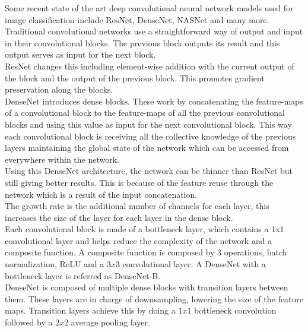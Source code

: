 \documentclass[runningheads,a4paper]{llncs}
\begin{document}
Some recent state of the art deep convolutional neural network models used for image classification include ResNet, DenseNet, NASNet and many more. \\

Traditional convolutional networks use a straightforward way of output and input in their convolutional blocks. The previous block outputs its result and this output serves as input for the next block. \\

ResNet changes this including element-wise addition with the current output of the block and the output of the previous block. This promotes gradient preservation along the blocks. \\

DenseNet \cite{densenet} introduces dense blocks. These work by concatenating the feature-maps of a convolutional block to the feature-maps of all the previous convolutional blocks and using this value as input for the next convolutional block. This way each convolutional block is receiving all the collective knowledge of the previous layers maintaining the global state of the network which can be accessed from everywhere within the network. \\

Using this DenseNet architecture, the network can be thinner than ResNet but still giving better results. This is because of the feature reuse through the network which is a result of the input concatenation. \\

The growth rate is the additional number of channels for each layer, this increases the size of the layer for each layer in the dense block. \\

Each convolutional block is made of a bottleneck layer, which contains a 1x1 convolutional layer and helps reduce the complexity of the network and a composite function. A composite function is composed by 3 operations, batch normalization, ReLU and a $3x3$ convolutional layer. A DenseNet with a bottleneck layer is referred as  DenseNet-B. \\

DenseNet is composed of multiple dense blocks with transition layers between them. These layers are in charge of downsampling, lowering the size of the feature maps. Transition layers achieve this by doing a $1x1$ bottleneck convolution followed by a $2x2$ average pooling layer. \\
\end{document}
